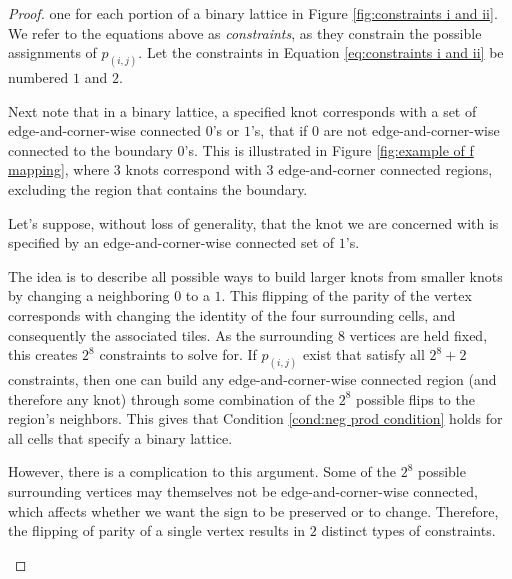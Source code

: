 \documentclass[12pt]{article}
\theoremstyle{plain}
\theoremstyle{definition}
\theoremstyle{remark}
\theoremstyle{definition}
\begin{document}
\begin{proof}
one for each portion of a binary lattice in Figure \ref{fig:constraints i and ii}. We refer to the equations above as \textit{constraints}, as they constrain the possible assignments of $p_{(i,j)}$. Let the constraints in Equation \ref{eq:constraints i and ii} be numbered $1$ and $2$.

Next note that in a binary lattice, a specified knot corresponds with a set of edge-and-corner-wise connected $0$'s or $1$'s, that if $0$ are not edge-and-corner-wise connected to the boundary $0$'s. This is illustrated in Figure \ref{fig:example of f mapping}, where $3$ knots correspond with $3$ edge-and-corner connected regions, excluding the region that contains the boundary. 

Let's suppose, without loss of generality, that the knot we are concerned with is specified by an edge-and-corner-wise connected set of $1$'s.

The idea is to describe all possible ways to build larger knots from smaller knots by changing a neighboring $0$ to a $1$. This flipping of the parity of the vertex corresponds with changing the identity of the four surrounding cells, and consequently the associated tiles. As the surrounding $8$ vertices are held fixed, this creates $2^8$ constraints to solve for. If $p_{(i,j)}$ exist that satisfy all $2^8 + 2$ constraints, then one can build any edge-and-corner-wise connected region (and therefore any knot) through some combination of the $2^8$ possible flips to the region's neighbors. This gives that Condition \ref{cond:neg prod condition} holds for all cells that specify a binary lattice.

However, there is a complication to this argument. Some of the $2^8$ possible surrounding vertices may themselves not be edge-and-corner-wise connected, which affects whether we want the sign to be preserved or to change. Therefore, the flipping of parity of a single vertex results in $2$ distinct types of constraints. 

\begin{figure}[h!]
    \begin{center}


\end{center}
\end{figure}
\end{proof}
\end{document}
